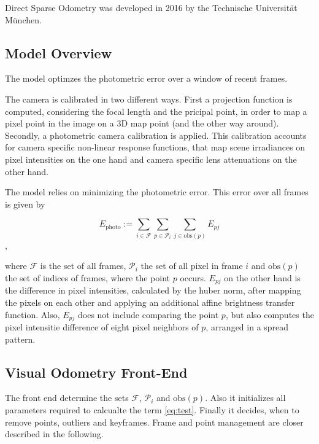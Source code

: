 	Direct Sparse Odometry was developed in 2016 by the Technische Universität München. %
	
	\subsection{Model Overview}\label{samemodel}
	
	The model optimzes the photometric error over a window of recent frames. 
	
	The camera is calibrated in two different ways. First a projection function is computed, considering the focal length and the pricipal point, 
	in order to map a pixel point in the image on a 3D map point (and the other way around). Secondly, a photometric camera calibration is applied. 
	This calibration accounts for camera specific non-linear response functions, that map scene irradiances on pixel intensities on the one hand and 
	camera specific lens attenuations on the other hand. 
	
	The model relies on minimizing the photometric error. This error over all frames is given by
	
	$$E_{\text{photo}}:= \sum_{i \in \mathcal{F}} \sum_{p \in \mathcal{P}_i} \sum_{j \in \text{obs}\left(p\right)} E_{pj}$$,
	
	where $\mathcal{F}$ is the set of all frames, $\mathcal{P}_i$ the set of all pixel in frame $i$ and $\text{obs}\left(p\right)$
	the set of indices of frames, where the point $p$ occurs. $E_{pj}$ on the other hand is the difference in pixel intensities, calculated 
	by the huber norm, after mapping the pixels on each other and applying an additional affine brightness transfer function. Also, $E_{pj}$ does not 
	include comparing the point $p$, but also computes the pixel intensitie difference of eight pixel neighbors of $p$, arranged in a spread pattern. 
	
	
	\subsection{Visual Odometry Front-End}
	
	The front end determine the sets $\mathcal{F}$, $\mathcal{P}_i$ and $\text{obs}\left(p\right)$. Also it initializes all parameters required to calcualte the term \ref{eq:test}. 
	Finally it decides, when to remove points, outliers and keyframes. Frame and point management are closer described in the following. 
	
